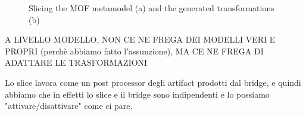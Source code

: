  \begin{figure}[htbp]
  \centering
  \caption{Slicing the MOF metamodel (a) and the generated transformations (b)}
  \label{fig:slicing}
\end{figure}


A LIVELLO MODELLO, NON CE NE FREGA DEI MODELLI VERI E PROPRI (perchè abbiamo fatto l'assunzione), MA CE NE FREGA DI ADATTARE LE TRASFORMAZIONI


Lo slice lavora come un post processor degli artifact prodotti dal bridge, e quindi abbiamo che in effetti lo slice e il bridge sono indipendenti e lo possiamo "attivare/disattivare" come ci pare.
